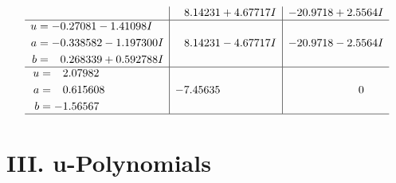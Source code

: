 \documentclass[1p]{elsarticle_modified}
\theoremstyle{definition}
\begin{document}
$$\begin{array}{c|c|c}
 & \phantom{-}8.14231 + 4.67717 I & -20.9718 + 2.5564 I \\ \hline\begin{aligned}
u &= -0.27081 - 1.41098 I \\
a &= -0.338582 - 1.197300 I \\
b &= \phantom{-}0.268339 + 0.592788 I\end{aligned}
 & \phantom{-}8.14231 - 4.67717 I & -20.9718 - 2.5564 I \\ \hline\begin{aligned}
u &= \phantom{-}2.07982\phantom{ +0.000000I} \\
a &= \phantom{-}0.615608\phantom{ +0.000000I} \\
b &= -1.56567\phantom{ +0.000000I}\end{aligned}
 & -7.45635\phantom{ +0.000000I} & \phantom{-0.000000 } 0\\
 \hline 
 \end{array}$$\newpage
\newpage\renewcommand{\arraystretch}{1}
\centering \section*{ III. u-Polynomials}
\end{document}
